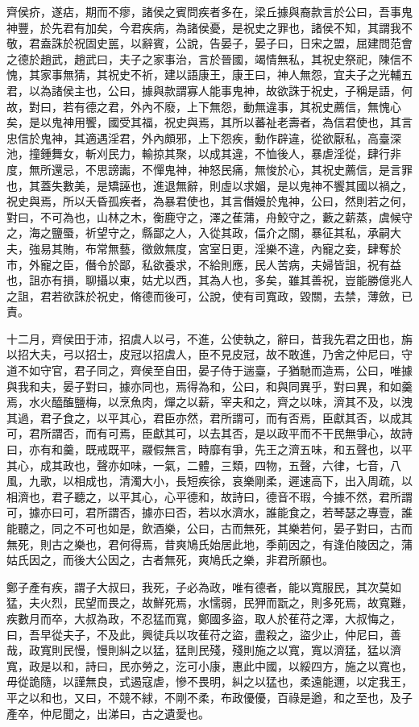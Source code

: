 \begin{pinyinscope}
齊侯疥，遂痁，期而不瘳，諸侯之賓問疾者多在，梁丘據與裔款言於公曰，吾事鬼神豐，於先君有加矣，今君疾病，為諸侯憂，是祝史之罪也，諸侯不知，其謂我不敬，君盍誅於祝固史嚚，以辭賓，公說，告晏子，晏子曰，日宋之盟，屈建問范會之德於趙武，趙武曰，夫子之家事治，言於晉國，竭情無私，其祝史祭祀，陳信不愧，其家事無猜，其祝史不祈，建以語康王，康王曰，神人無怨，宜夫子之光輔五君，以為諸侯主也，公曰，據與款謂寡人能事鬼神，故欲誅于祝史，子稱是語，何故，對曰，若有德之君，外內不廢，上下無怨，動無違事，其祝史薦信，無愧心矣，是以鬼神用饗，國受其福，祝史與焉，其所以蕃祉老壽者，為信君使也，其言忠信於鬼神，其適遇淫君，外內頗邪，上下怨疾，動作辟違，從欲厭私，高臺深池，撞鍾舞女，斬刈民力，輸掠其聚，以成其違，不恤後人，暴虐淫從，肆行非度，無所還忌，不思謗讟，不憚鬼神，神怒民痛，無悛於心，其祝史薦信，是言罪也，其蓋失數美，是矯誣也，進退無辭，則虛以求媚，是以鬼神不饗其國以禍之，祝史與焉，所以夭昏孤疾者，為暴君使也，其言僭嫚於鬼神，公曰，然則若之何，對曰，不可為也，山林之木，衡鹿守之，澤之萑蒲，舟鮫守之，藪之薪蒸，虞候守之，海之鹽蜃，祈望守之，縣鄙之人，入從其政，偪介之關，暴征其私，承嗣大夫，強易其賄，布常無藝，徵斂無度，宮室日更，淫樂不違，內寵之妾，肆奪於市，外寵之臣，僭令於鄙，私欲養求，不給則應，民人苦病，夫婦皆詛，祝有益也，詛亦有損，聊攝以東，姑尤以西，其為人也，多矣，雖其善祝，豈能勝億兆人之詛，君若欲誅於祝史，脩德而後可，公說，使有司寬政，毀關，去禁，薄斂，已責。

十二月，齊侯田于沛，招虞人以弓，不進，公使執之，辭曰，昔我先君之田也，旃以招大夫，弓以招士，皮冠以招虞人，臣不見皮冠，故不敢進，乃舍之仲尼曰，守道不如守官，君子同之，齊侯至自田，晏子侍于遄臺，子猶馳而造焉，公曰，唯據與我和夫，晏子對曰，據亦同也，焉得為和，公曰，和與同異乎，對曰異，和如羹焉，水火醯醢鹽梅，以烹魚肉，燀之以薪，宰夫和之，齊之以味，濟其不及，以洩其過，君子食之，以平其心，君臣亦然，君所謂可，而有否焉，臣獻其否，以成其可，君所謂否，而有可焉，臣獻其可，以去其否，是以政平而不干民無爭心，故詩曰，亦有和羹，既戒既平，鬷假無言，時靡有爭，先王之濟五味，和五聲也，以平其心，成其政也，聲亦如味，一氣，二體，三類，四物，五聲，六律，七音，八風，九歌，以相成也，清濁大小，長短疾徐，哀樂剛柔，遲速高下，出入周疏，以相濟也，君子聽之，以平其心，心平德和，故詩曰，德音不瑕，今據不然，君所謂可，據亦曰可，君所謂否，據亦曰否，若以水濟水，誰能食之，若琴瑟之專壹，誰能聽之，同之不可也如是，飲酒樂，公曰，古而無死，其樂若何，晏子對曰，古而無死，則古之樂也，君何得焉，昔爽鳩氏始居此地，季萴因之，有逢伯陵因之，蒲姑氏因之，而後大公因之，古者無死，爽鳩氏之樂，非君所願也。

鄭子產有疾，謂子大叔曰，我死，子必為政，唯有德者，能以寬服民，其次莫如猛，夫火烈，民望而畏之，故鮮死焉，水懦弱，民狎而翫之，則多死焉，故寬難，疾數月而卒，大叔為政，不忍猛而寬，鄭國多盜，取人於萑苻之澤，大叔悔之，曰，吾早從夫子，不及此，興徒兵以攻萑苻之盜，盡殺之，盜少止，仲尼曰，善哉，政寬則民慢，慢則糾之以猛，猛則民殘，殘則施之以寬，寬以濟猛，猛以濟寬，政是以和，詩曰，民亦勞之，汔可小康，惠此中國，以綏四方，施之以寬也，毋從詭隨，以謹無良，式遏寇虐，慘不畏明，糾之以猛也，柔遠能邇，以定我王，平之以和也，又曰，不競不絿，不剛不柔，布政優優，百祿是遒，和之至也，及子產卒，仲尼聞之，出涕曰，古之遺愛也。


\end{pinyinscope}
